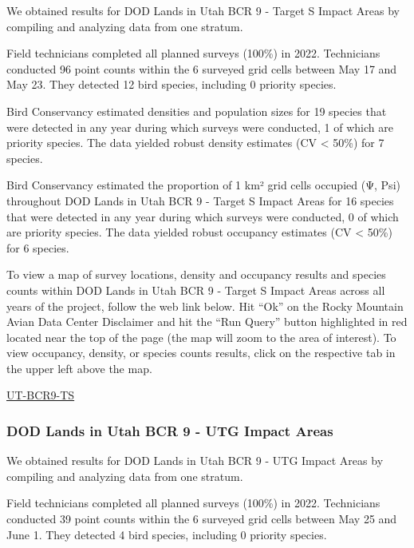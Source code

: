 \documentclass[
  letterpaper,
  DIV=11,
  numbers=noendperiod,
  oneside]{scrreprt}
\begin{document}
We obtained results for DOD Lands in Utah BCR 9 - Target S Impact Areas
by compiling and analyzing data from one stratum.

Field technicians completed all planned surveys (100\%) in 2022.
Technicians conducted 96 point counts within the 6 surveyed grid cells
between May 17 and May 23. They detected 12 bird species, including 0
priority species.

Bird Conservancy estimated densities and population sizes for 19 species
that were detected in any year during which surveys were conducted, 1 of
which are priority species. The data yielded robust density estimates
(CV \textless{} 50\%) for 7 species.

Bird Conservancy estimated the proportion of 1 km² grid cells occupied
(Ψ, Psi) throughout DOD Lands in Utah BCR 9 - Target S Impact Areas for
16 species that were detected in any year during which surveys were
conducted, 0 of which are priority species. The data yielded robust
occupancy estimates (CV \textless{} 50\%) for 6 species.

To view a map of survey locations, density and occupancy results and
species counts within DOD Lands in Utah BCR 9 - Target S Impact Areas
across all years of the project, follow the web link below. Hit ``Ok''
on the Rocky Mountain Avian Data Center Disclaimer and hit the ``Run
Query'' button highlighted in red located near the top of the page (the
map will zoom to the area of interest). To view occupancy, density, or
species counts results, click on the respective tab in the upper left
above the map.

\href{http://www.rmbo.org/new_site/adc/QueryWindow.aspx\#N4IgzgLgTghhCuBbEAuABCAqgFQLQCEBhAJQE5dsBldAEQFMAHGKCROgOwjQHsAzNerw5g6aXGmzMA5nS6U0ASURMAxlwCCUOjBABfIA}{UT-BCR9-TS}

\hypertarget{dod-lands-in-utah-bcr-9---utg-impact-areas}{%
\subsubsection{DOD Lands in Utah BCR 9 - UTG Impact
Areas}\label{dod-lands-in-utah-bcr-9---utg-impact-areas}}

We obtained results for DOD Lands in Utah BCR 9 - UTG Impact Areas by
compiling and analyzing data from one stratum.

Field technicians completed all planned surveys (100\%) in 2022.
Technicians conducted 39 point counts within the 6 surveyed grid cells
between May 25 and June 1. They detected 4 bird species, including 0
priority species.
\end{document}

